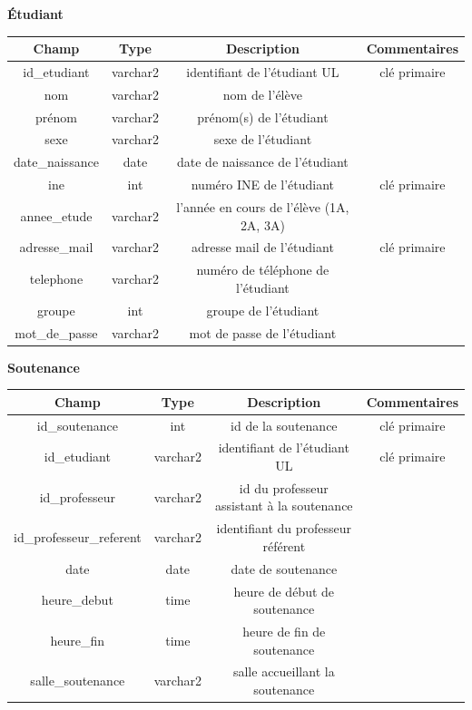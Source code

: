 \documentclass{scrreprt}
\begin{document}
\vspace {4cm}
\begin{center}
\textbf 
{Étudiant}
\vspace {0,5cm}

\begin{tabular}{|c|c|c|c|}
  \hline
  \textbf {Champ} & \textbf {Type} & \textbf {Description} & \textbf {Commentaires} \\
  \hline
  id_etudiant & varchar2 & identifiant de l'étudiant UL & clé primaire\\
  \hline
  nom & varchar2 & nom de l'élève &  \\
  \hline
  prénom & varchar2 & prénom(s) de l'étudiant &  \\
  \hline
  sexe & varchar2 & sexe de l'étudiant &  \\
  \hline
  date_naissance & date & date de naissance de l'étudiant &  \\
  \hline
  ine & int & numéro INE de l'étudiant & clé primaire \\
  \hline
  annee_etude & varchar2 & l'année en cours de l'élève (1A, 2A, 3A) &  \\
  \hline
  adresse_mail & varchar2 & adresse mail de l'étudiant & clé primaire\\
  \hline
  telephone & varchar2 & numéro de téléphone de l'étudiant &  \\
  \hline
  groupe & int & groupe de l'étudiant &  \\
  \hline
  mot_de_passe & varchar2 & mot de passe de l'étudiant &  \\
  \hline
\end{tabular}

\vspace {1cm}
\textbf 
{Soutenance}
\vspace {0,5cm}

\begin{tabular}{|c|c|c|c|}
  \hline
  \textbf {Champ} & \textbf {Type} & \textbf {Description} & \textbf {Commentaires} \\
  \hline
  id_soutenance & int & id de la soutenance & clé primaire\\
  \hline
  id_etudiant & varchar2 & identifiant de l'étudiant UL & clé primaire\\
  \hline
  id_professeur & varchar2 & id du professeur assistant à la soutenance &  \\
  \hline
  id_professeur_referent & varchar2 & identifiant du professeur référent &  \\
  \hline
  date & date & date de soutenance &  \\
  \hline
  heure_debut & time & heure de début de soutenance &  \\
  \hline
  heure_fin & time & heure de fin de soutenance &  \\
  \hline
  salle_soutenance & varchar2 & salle accueillant la soutenance &  \\
  \hline
\end{tabular}


\end{center}
\end{document}
